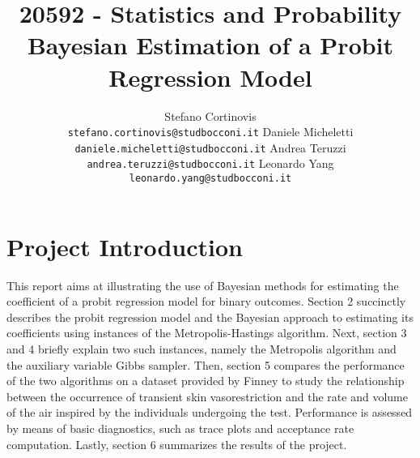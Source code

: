 \documentclass{article}
\title{20592 - Statistics and Probability\\Bayesian Estimation of a Probit Regression Model}
\author{%
  Stefano Cortinovis \\
  \texttt{stefano.cortinovis@studbocconi.it}
  \And
  Daniele Micheletti\\
  \texttt{daniele.micheletti@studbocconi.it}
  \And
  Andrea Teruzzi\\
  \texttt{andrea.teruzzi@studbocconi.it}
  \And
  Leonardo Yang\\
  \texttt{leonardo.yang@studbocconi.it}
}
\begin{document}
\maketitle

\section{Project Introduction}

This report aims at illustrating the use of Bayesian methods for estimating the coefficient of a probit regression model for binary outcomes. Section 2 succinctly describes the probit regression model and the Bayesian approach to estimating its coefficients using instances of the Metropolis-Hastings algorithm. Next, section 3 and 4 briefly explain two such instances, namely the Metropolis algorithm and the auxiliary variable Gibbs sampler. Then, section 5 compares the performance of the two algorithms on a dataset provided by Finney \cite{finney1947estimation} to study the relationship between the occurrence of transient skin vasorestriction and the rate and volume of the air inspired by the individuals undergoing the test. Performance is assessed by means of basic diagnostics, such as trace plots and acceptance rate computation. Lastly, section 6 summarizes the results of the project.
\end{document}
